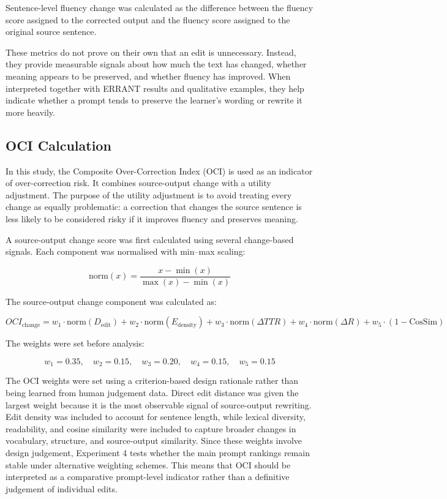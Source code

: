 Sentence-level fluency change was calculated as the difference between the fluency score assigned to the corrected output and the fluency score assigned to the original source sentence.

These metrics do not prove on their own that an edit is unnecessary. Instead, they provide measurable signals about how much the text has changed, whether meaning appears to be preserved, and whether fluency has improved. When interpreted together with ERRANT results and qualitative examples, they help indicate whether a prompt tends to preserve the learner's wording or rewrite it more heavily.

\subsection{OCI Calculation}

In this study, the Composite Over-Correction Index (OCI) is used as an indicator of over-correction risk. It combines source-output change with a utility adjustment. The purpose of the utility adjustment is to avoid treating every change as equally problematic: a correction that changes the source sentence is less likely to be considered risky if it improves fluency and preserves meaning.

A source-output change score was first calculated using several change-based signals. Each component was normalised with min--max scaling:

\begin{equation}
\text{norm}(x) = \frac{x - \min(x)}{\max(x) - \min(x)}
\end{equation}

\noindent The source-output change component was calculated as:

\begin{equation}
OCI_{\text{change}} = w_1 \cdot \text{norm}(D_{\text{edit}}) 
+ w_2 \cdot \text{norm}(E_{\text{density}}) 
+ w_3 \cdot \text{norm}(\Delta TTR) 
+ w_4 \cdot \text{norm}(\Delta R) 
+ w_5 \cdot (1 - \text{CosSim})
\end{equation}

The weights were set before analysis:

\[
w_1 = 0.35,\quad
w_2 = 0.15,\quad
w_3 = 0.20,\quad
w_4 = 0.15,\quad
w_5 = 0.15
\]

The OCI weights were set using a criterion-based design rationale rather than being learned from human judgement data. Direct edit distance was given the largest weight because it is the most observable signal of source-output rewriting. Edit density was included to account for sentence length, while lexical diversity, readability, and cosine similarity were included to capture broader changes in vocabulary, structure, and source-output similarity. Since these weights involve design judgement, Experiment 4 tests whether the main prompt rankings remain stable under alternative weighting schemes. This means that OCI should be interpreted as a comparative prompt-level indicator rather than a definitive judgement of individual edits.

